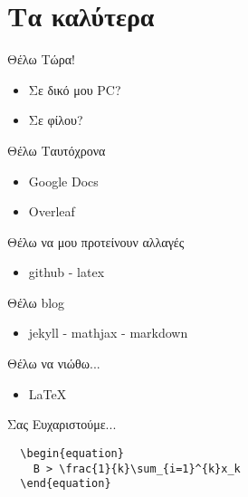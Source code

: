 \documentclass[greek]{beamer}
\begin{document}
\section{Τα καλύτερα}
\begin{frame}{Θέλω Τώρα!}
  \begin{itemize}
    \item Σε δικό μου PC?
    \item Σε φίλου?
  \end{itemize}
\end{frame}

\begin{frame}{Θέλω Ταυτόχρονα}
  \begin{itemize}
    \item Google Docs
    \item Overleaf
  \end{itemize}
\end{frame}

\begin{frame}{Θέλω να μου προτείνουν αλλαγές}
  \begin{itemize}
    \item github - latex
  \end{itemize}
\end{frame}

\begin{frame}{Θέλω blog}
  \begin{itemize}
    \item jekyll - mathjax - markdown
  \end{itemize}
\end{frame}

\begin{frame}{Θέλω να νιώθω...}
  \begin{itemize}
    \item \LaTeX
  \end{itemize}
\end{frame}

\begin{frame}
  \begin{center}
    \Huge Σας Ευχαριστούμε...
  \end{center}
\begin{verbatim}
  \begin{equation}
    B > \frac{1}{k}\sum_{i=1}^{k}x_k
  \end{equation}
\end{verbatim}

\end{frame}
\end{document}

